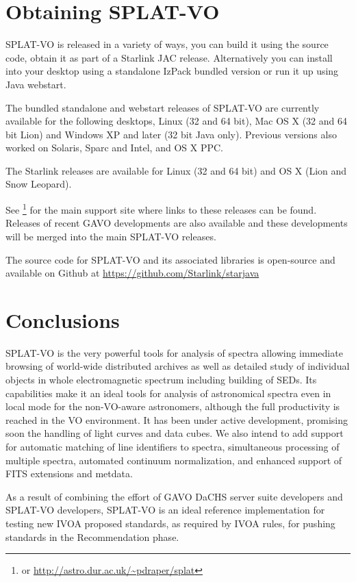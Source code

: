 \documentclass[final,authoryear,5p,times,twocolumn]{elsarticle}
\begin{document}
\section{Obtaining SPLAT-VO}

SPLAT-VO is released in a variety of ways, you can build it using the source
code, obtain it as part of a Starlink JAC release. Alternatively you can
install into your desktop using a standalone IzPack bundled version or run it
up using Java webstart.

The bundled standalone and webstart releases of SPLAT-VO are currently
available for the following desktops, Linux (32 and 64 bit), Mac OS X (32 and
64 bit Lion) and Windows XP and later (32 bit Java only). Previous versions
also worked on Solaris, Sparc and Intel, and OS X PPC.

The Starlink releases
\citep[e.g.,][]{currie_adassxxiii,2013ASPC..475..247B} are available
for Linux (32 and 64 bit) and OS X (Lion and Snow Leopard).

See \footnote{or \url{http://astro.dur.ac.uk/~pdraper/splat}}
for the main support site where links to these releases can be found.
Releases of recent GAVO developments are also available and these
developments will be merged into the main SPLAT-VO releases.

The source code for SPLAT-VO and its associated libraries is
open-source and available on Github at
\url{https://github.com/Starlink/starjava}


\section{Conclusions}

SPLAT-VO is the very powerful tools for analysis of spectra
allowing immediate browsing of world-wide distributed archives as well
as detailed study of individual objects in whole electromagnetic
spectrum including building of SEDs. Its capabilities make it an
ideal tools for analysis of astronomical spectra even in local mode
for the non-VO-aware astronomers, although the full productivity is
reached in the VO environment. It has been under active development, promising soon the handling of
light curves and data cubes. We also intend to add support for
automatic matching of line identifiers to spectra, simultaneous
processing of multiple spectra, automated continuum normalization, and
enhanced support of FITS extensions and metdata.

As a result of combining the effort of GAVO DaCHS server suite
developers and SPLAT-VO developers, SPLAT-VO is an ideal reference
implementation for testing new IVOA proposed standards, as required by
IVOA rules, for pushing standards in the Recommendation phase.
\end{document}
